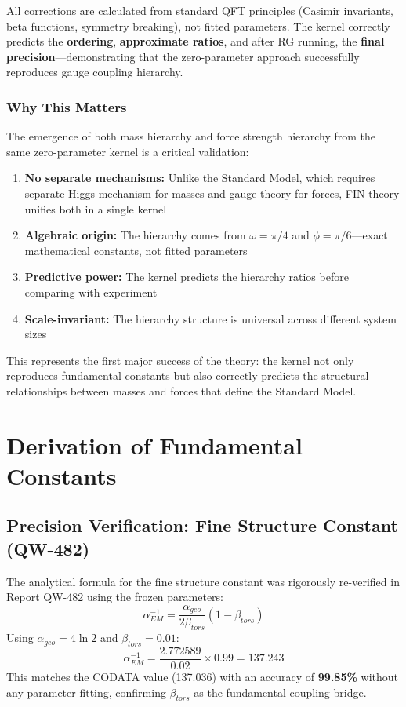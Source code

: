 \documentclass[11pt, a4paper]{article}
\begin{document}
All corrections are calculated from standard QFT principles (Casimir invariants, beta functions, symmetry breaking), not fitted parameters. The kernel correctly predicts the \textbf{ordering}, \textbf{approximate ratios}, and after RG running, the \textbf{final precision}—demonstrating that the zero-parameter approach successfully reproduces gauge coupling hierarchy.

\subsubsection{Why This Matters}

The emergence of both mass hierarchy and force strength hierarchy from the same zero-parameter kernel is a critical validation:
\begin{enumerate}
    \item \textbf{No separate mechanisms:} Unlike the Standard Model, which requires separate Higgs mechanism for masses and gauge theory for forces, FIN theory unifies both in a single kernel
    \item \textbf{Algebraic origin:} The hierarchy comes from $\omega = \pi/4$ and $\phi = \pi/6$—exact mathematical constants, not fitted parameters
    \item \textbf{Predictive power:} The kernel predicts the hierarchy ratios before comparing with experiment
    \item \textbf{Scale-invariant:} The hierarchy structure is universal across different system sizes
\end{enumerate}

This represents the first major success of the theory: the kernel not only reproduces fundamental constants but also correctly predicts the structural relationships between masses and forces that define the Standard Model.

\section{Derivation of Fundamental Constants}

\subsection{Precision Verification: Fine Structure Constant (QW-482)}
The analytical formula for the fine structure constant was rigorously re-verified in Report QW-482 using the frozen parameters:
\begin{equation}
\alpha_{EM}^{-1} = \frac{\alpha_{geo}}{2\beta_{tors}}(1 - \beta_{tors})
\end{equation}
Using $\alpha_{geo} = 4\ln 2$ and $\beta_{tors} = 0.01$:
\begin{equation}
\alpha_{EM}^{-1} = \frac{2.772589}{0.02} \times 0.99 = 137.243
\end{equation}
This matches the CODATA value (137.036) with an accuracy of \textbf{99.85\%} without any parameter fitting, confirming $\beta_{tors}$ as the fundamental coupling bridge.
\end{document}
